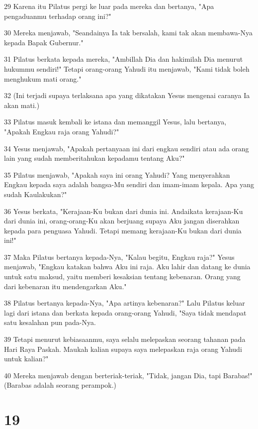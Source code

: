 \par 29 Karena itu Pilatus pergi ke luar pada mereka dan bertanya, "Apa pengaduanmu terhadap orang ini?"
\par 30 Mereka menjawab, "Seandainya Ia tak bersalah, kami tak akan membawa-Nya kepada Bapak Gubernur."
\par 31 Pilatus berkata kepada mereka, "Ambillah Dia dan hakimilah Dia menurut hukummu sendiri!" Tetapi orang-orang Yahudi itu menjawab, "Kami tidak boleh menghukum mati orang."
\par 32 (Ini terjadi supaya terlaksana apa yang dikatakan Yesus mengenai caranya Ia akan mati.)
\par 33 Pilatus masuk kembali ke istana dan memanggil Yesus, lalu bertanya, "Apakah Engkau raja orang Yahudi?"
\par 34 Yesus menjawab, "Apakah pertanyaan ini dari engkau sendiri atau ada orang lain yang sudah memberitahukan kepadamu tentang Aku?"
\par 35 Pilatus menjawab, "Apakah saya ini orang Yahudi? Yang menyerahkan Engkau kepada saya adalah bangsa-Mu sendiri dan imam-imam kepala. Apa yang sudah Kaulakukan?"
\par 36 Yesus berkata, "Kerajaan-Ku bukan dari dunia ini. Andaikata kerajaan-Ku dari dunia ini, orang-orang-Ku akan berjuang supaya Aku jangan diserahkan kepada para penguasa Yahudi. Tetapi memang kerajaan-Ku bukan dari dunia ini!"
\par 37 Maka Pilatus bertanya kepada-Nya, "Kalau begitu, Engkau raja?" Yesus menjawab, "Engkau katakan bahwa Aku ini raja. Aku lahir dan datang ke dunia untuk satu maksud, yaitu memberi kesaksian tentang kebenaran. Orang yang dari kebenaran itu mendengarkan Aku."
\par 38 Pilatus bertanya kepada-Nya, "Apa artinya kebenaran?" Lalu Pilatus keluar lagi dari istana dan berkata kepada orang-orang Yahudi, "Saya tidak mendapat satu kesalahan pun pada-Nya.
\par 39 Tetapi menurut kebiasaanmu, saya selalu melepaskan seorang tahanan pada Hari Raya Paskah. Maukah kalian supaya saya melepaskan raja orang Yahudi untuk kalian?"
\par 40 Mereka menjawab dengan berteriak-teriak, "Tidak, jangan Dia, tapi Barabas!" (Barabas adalah seorang perampok.)

\chapter{19}

